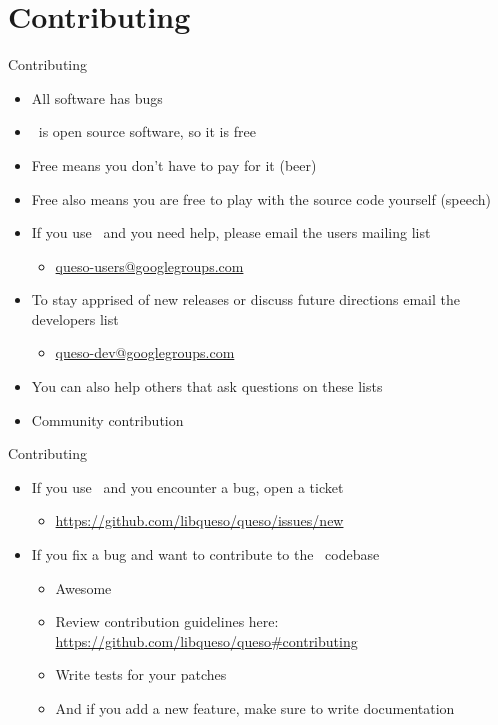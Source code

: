 \section{Contributing}
\begin{frame}[fragile]{Contributing}
  \begin{itemize}
    \item All software has bugs
    \item \Queso\ is open source software, so it is free
    \item Free means you don't have to pay for it (beer)
    \item Free also means you are free to play with the source code yourself
      (speech)
    \item If you use \Queso\ and you need help, please email the users mailing
      list
      \begin{itemize}
        \item \url{queso-users@googlegroups.com}
      \end{itemize}
    \item To stay apprised of new releases or discuss future directions email
      the developers list
      \begin{itemize}
        \item \url{queso-dev@googlegroups.com}
      \end{itemize}
    \item You can also help others that ask questions on these lists
    \item Community contribution
  \end{itemize}
\end{frame}

\begin{frame}[fragile]{Contributing}
  \begin{itemize}
    \item If you use \Queso\ and you encounter a bug, open a ticket
      \begin{itemize}
        \item \url{https://github.com/libqueso/queso/issues/new}
      \end{itemize}
    \item If you fix a bug and want to contribute to the \Queso\ codebase
      \begin{itemize}
        \item Awesome
        \item Review contribution guidelines here:
          \url{https://github.com/libqueso/queso#contributing}
        \item Write tests for your patches
        \item And if you add a new feature, make sure to write documentation
      \end{itemize}
  \end{itemize}
\end{frame}
